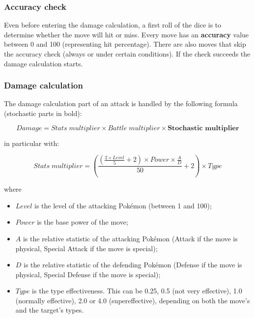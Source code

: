 \documentclass{article}
\begin{document}
\subsubsection{Accuracy check}

Even before entering the damage calculation, a first roll of the dice is to determine whether the move will hit or miss. Every move has an \textbf{accuracy} value between 0 and 100 (representing hit percentage). There are also moves that skip the accuracy check (always or under certain conditions).
If the check succeeds the damage calculation starts.

\subsubsection{Damage calculation}

The damage calculation part of an attack is handled by the following formula \cite{Damage} (stochastic parts in bold):

\begin{equation}
    Damage = Stats \; multiplier \times Battle \; multiplier \times \textbf{Stochastic multiplier}
\end{equation}

in particular with:

\begin{equation}
    Stats \; multiplier = \left(\frac{\left(\frac{2 \times Level}{5} + 2\right) \times Power \times \frac{A}{D}}{50} + 2 \right) \times Type
\end{equation}

where

\begin{itemize}
    \item $Level$ is the level of the attacking Pokémon (between 1 and 100);
    \item $Power$ is the base power of the move;
    \item $A$ is the relative statistic of the attacking Pokémon (Attack if the move is physical, Special Attack if the move is special);
    \item $D$ is the relative statistic of the defending Pokémon (Defense if the move is physical, Special Defense if the move is special);
    \item $Type$ is the type effectiveness. This can be 0.25, 0.5 (not very effective), 1.0 (normally effective), 2.0 or 4.0 (supereffective), depending on both the move's and the target's types.
\end{itemize}
\end{document}
